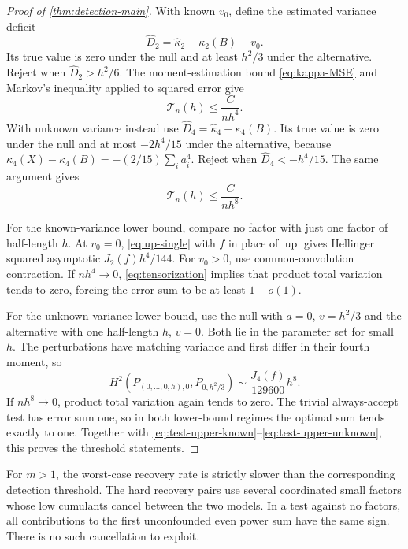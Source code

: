 \documentclass[11pt,a4paper]{article}
\numberwithin{equation}{section}
\theoremstyle{definition}
\theoremstyle{remark}
\newcommand{\up}{\operatorname{up}}
\begin{document}
\begin{proof}[Proof of \cref{thm:detection-main}]
With known $v_0$, define the estimated variance deficit
\[
 \widehat D_2=\widehat\kappa_2-\kappa_2(B)-v_0.
\]
Its true value is zero under the null and at least $h^2/3$ under the
alternative. Reject when $\widehat D_2>h^2/6$. The moment-estimation
bound \eqref{eq:kappa-MSE} and Markov's inequality applied to squared
error give
\begin{equation}
 \mathcal T_n(h)\le\frac{C}{nh^4}.
 \label{eq:test-upper-known}
\end{equation}
With unknown variance instead use
$\widehat D_4=\widehat\kappa_4-\kappa_4(B)$. Its true value is zero
under the null and at most $-2h^4/15$ under the alternative, because
$\kappa_4(X)-\kappa_4(B)=-(2/15)\sum_i a_i^4$.
Reject when $\widehat D_4<-h^4/15$. The same argument gives
\begin{equation}
 \mathcal T_n(h)\le\frac{C}{nh^8}.
 \label{eq:test-upper-unknown}
\end{equation}

For the known-variance lower bound, compare no factor with just one factor
of half-length $h$. At $v_0=0$, \eqref{eq:up-single} with $f$ in place
of $\up$ gives Hellinger squared asymptotic $J_2(f)h^4/144$.
For $v_0>0$, use common-convolution contraction. If $nh^4\to0$,
\eqref{eq:tensorization} implies that product total variation tends to
zero, forcing the error sum to be at least $1-o(1)$.

For the unknown-variance lower bound, use the null with $a=0$, $v=h^2/3$
and the alternative with one half-length $h$, $v=0$. Both lie in the
parameter set for small $h$. The perturbations have matching variance and
first differ in their fourth moment, so
\begin{equation}
 H^2(P_{(0,\ldots,0,h),0},P_{0,h^2/3})
 \sim\frac{J_4(f)}{129600}h^8.
 \label{eq:test-hard-pair}
\end{equation}
If $nh^8\to0$, product total variation again tends to zero. The trivial
always-accept test has error sum one, so in both lower-bound regimes the
optimal sum tends exactly to one. Together with
\eqref{eq:test-upper-known}--\eqref{eq:test-upper-unknown}, this proves
the threshold statements.
\end{proof}

For $m>1$, the worst-case recovery rate is strictly slower than the
corresponding detection threshold. The hard recovery pairs use several
coordinated small factors whose low cumulants cancel between the two
models. In a test against no factors, all contributions to the first
unconfounded even power sum have the same sign. There is no such
cancellation to exploit.
\end{document}
